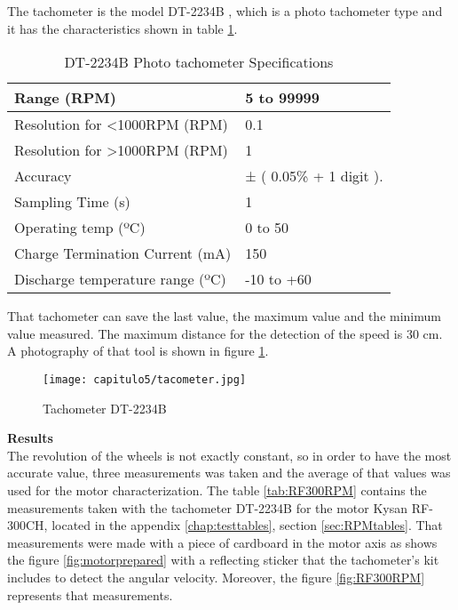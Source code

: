 The tachometer is the model DT-2234B \cite{tacometer}, which is a photo tachometer type and it has the characteristics shown in table \ref{tab:tachometer}.
\begin{table}[H]
\centering
\begin{tabular}{|l|l|}
\hline
Range (RPM) & 5 to 99999 \\ \hline
Resolution for <1000RPM  (RPM)     & 0.1     \\ \hline
Resolution for >1000RPM  (RPM)           & 1       \\ \hline
Accuracy          & ± ( 0.05\% + 1 digit ). \\ \hline
Sampling Time (s)      &  1                    \\ \hline
Operating temp (ºC)          & 0 to 50    \\ \hline
Charge Termination Current  (mA)          & 150    \\ \hline
Discharge temperature range (ºC)          & -10 to +60     \\ \hline
\end{tabular}
\caption{DT-2234B Photo tachometer Specifications \cite{tacometer}}\label{tab:tachometer}
\end{table}

That tachometer can save the last value, the maximum value and the minimum value measured. The maximum distance for the detection of the speed  is 30 cm. A photography of that tool is shown in figure \ref{fig:tacometer}.

\begin{figure}[H]
	\centering
		\texttt{[image: capitulo5/tacometer.jpg]}
	\caption{Tachometer DT-2234B \cite{tacometer}}	\label{fig:tacometer}
\end{figure}


\textbf{Results} \\

The revolution of the wheels is not exactly constant, so in order to have the most accurate value, three measurements was taken and the average of that values was used for the motor characterization. 
The table \ref{tab:RF300RPM} contains the measurements taken with the tachometer DT-2234B for the motor Kysan RF-300CH, located in the appendix \ref{chap:testtables}, section \ref{sec:RPMtables}. That measurements were made with a piece of cardboard in the motor axis as shows the figure \ref{fig:motorprepared} with a reflecting sticker that the tachometer's kit includes to detect the angular velocity. Moreover, the figure \ref{fig:RF300RPM} represents that measurements.


